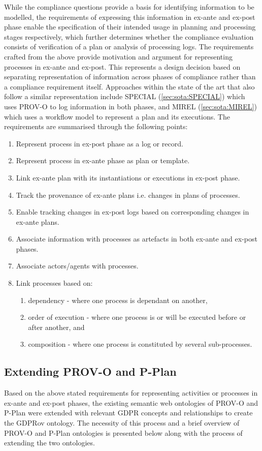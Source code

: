 While the compliance questions provide a basis for identifying information to be modelled, the requirements of expressing this information in ex-ante and ex-post phase enable the specification of their intended usage in planning and processing stages respectively, which further determines whether the compliance evaluation consists of verification of a plan or analysis of processing logs. 
The requirements crafted from the above provide motivation and argument for representing processes in ex-ante and ex-post.
This represents a design decision based on separating representation of information across phases of compliance rather than a compliance requirement itself.
Approaches within the state of the art that also follow a similar representation include SPECIAL (\autoref{sec:sota:SPECIAL}) which uses PROV-O to log information in both phases, and MIREL (\autoref{sec:sota:MIREL}) which uses a workflow model to represent a plan and its executions.
The requirements are summarised through the following points:
\begin{enumerate}
    \item Represent process in ex-post phase as a log or record.
    \item Represent process in ex-ante phase as plan or template.
    \item Link ex-ante plan with its instantiations or executions in ex-post phase.
    \item Track the provenance of ex-ante plans i.e. changes in plans of processes.
    \item Enable tracking changes in ex-post logs based on corresponding changes in ex-ante plans.
    \item Associate information with processes as artefacts in both ex-ante and ex-post phases.
    \item Associate actors/agents with processes.
    \item Link processes based on:
        \begin{enumerate}
            \item dependency - where one process is dependant on another,
            \item order of execution - where one process is or will be executed before or after another, and
            \item composition - where one process is constituted by several sub-processes.
        \end{enumerate}
\end{enumerate}

\subsection{Extending PROV-O and P-Plan}
Based on the above stated requirements for representing activities or processes in ex-ante and ex-post phases, the existing semantic web ontologies of PROV-O \cite{lebo_prov-o_2013} and P-Plan \cite{garijo_p-plan_2014} were extended with relevant GDPR concepts and relationships to create the GDPRov ontology. The necessity of this process and a brief overview of PROV-O and P-Plan ontologies is presented below along with the process of extending the two ontologies.

